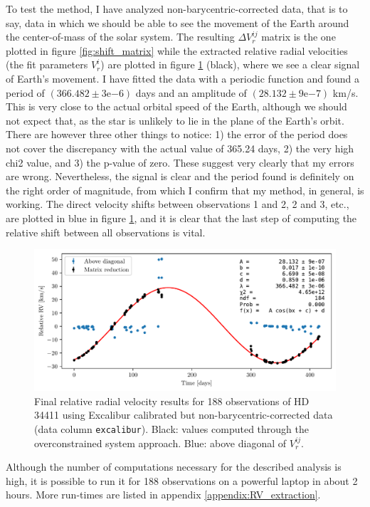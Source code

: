     To test the method, I have analyzed non-barycentric-corrected data, that is to say, data in which we should be able to see the movement of the Earth around the center-of-mass of the solar system. The resulting $\Delta V_r^{ij}$ matrix is the one plotted in figure \ref{fig:shift_matrix} while the extracted relative radial velocities (the fit parameters $V_r^i$) are plotted in figure \ref{fig:RV_results_non_barycentric} (black), where we see a clear signal of Earth's movement. I have fitted the data with a periodic function and found a  period of $(366.482 \pm 3\mathrm{e}{-6})$ days and an amplitude of $(28.132 \pm 9\mathrm{e}{-7})$ km/s. This is very close to the actual orbital speed of the Earth, although we should not expect that, as the star is unlikely to lie in the plane of the Earth's orbit. There are however three other things to notice: 1) the error of the period does not cover the discrepancy with the actual value of 365.24 days, 2) the very high chi2 value, and 3) the p-value of zero. These suggest very clearly that my errors are wrong. Nevertheless, the signal is clear and the period found is definitely on the right order of magnitude, from which I confirm that my method, in general, is working. The direct velocity shifts between observations 1 and 2, 2 and 3, etc.,  are plotted in blue in figure \ref{fig:RV_results_non_barycentric}, and it is clear that the last step of computing the relative shift between all observations is vital.

    \begin{figure}%
        \begin{wide}  
            \includegraphics[width=\textwidth]{figures/shift_non_bary_centric.pdf}
            \caption{Final relative radial velocity results for 188 observations of HD 34411 using Excalibur calibrated but non-barycentric-corrected data (data column \texttt{excalibur}). Black: values computed through the overconstrained system approach. Blue: above diagonal of $V_r^{ij}$.}
            \label{fig:RV_results_non_barycentric}
        \end{wide}
    \end{figure}

    Although the number of computations necessary for the described analysis is high, it is possible to run it for 188 observations on a powerful laptop in about 2 hours. More run-times are listed in appendix \ref{appendix:RV_extraction}.
    

